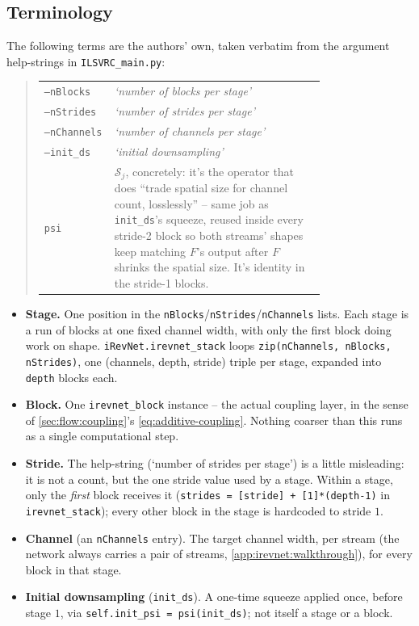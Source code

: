 \subsection{Terminology}
\label{app:irevnet:terms}
The following terms are the authors' own, taken verbatim from the argument help-strings in
\texttt{ILSVRC\_main.py}:
\begin{quote}
\begin{flushleft}
\begin{tabular}{@{}l@{\quad}p{0.75\linewidth}@{}}
\texttt{--nBlocks}  & \emph{`number of blocks per stage'}\\
\texttt{--nStrides} & \emph{`number of strides per stage'}\\
\texttt{--nChannels}& \emph{`number of channels per stage'}\\
\texttt{--init\_ds} & \emph{`initial downsampling'}\\
\texttt{psi} & $\mathcal S_j$, concretely: it's the operator that does ``trade spatial size for channel 
count, losslessly'' -- same job as \texttt{init\_ds}'s squeeze, reused inside every stride-2 block so 
both streams' shapes keep matching $F$'s output after $F$ shrinks the spatial size. It's identity in the 
stride-1 blocks.
\end{tabular}
\end{flushleft}
\end{quote}
\begin{itemize}[leftmargin=1.5em]
\item \textbf{Stage.} One position in the \texttt{nBlocks}/\texttt{nStrides}/\texttt{nChannels} lists.
	  Each stage is a run of blocks at one fixed channel width, with only the first block doing work on 
	  shape.
      \texttt{iRevNet.irevnet\_stack} loops \texttt{zip(nChannels, nBlocks, nStrides)}, one
      (channels, depth, stride) triple per stage, expanded into \texttt{depth} blocks each.
\item \textbf{Block.} One \texttt{irevnet\_block} instance -- the actual coupling layer, in the sense of
      \cref{sec:flow:coupling}'s \cref{eq:additive-coupling}. Nothing coarser than this runs as a single
      computational step.
\item \textbf{Stride.} The help-string (`number of strides per stage') is a little misleading: it is not a
      count, but the one stride value used by a stage. Within a stage, only the \emph{first} block receives
      it (\texttt{strides = [stride] + [1]*(depth-1)} in \texttt{irevnet\_stack}); every other block in the
      stage is hardcoded to stride $1$.
\item \textbf{Channel} (an \texttt{nChannels} entry). The target channel width, per stream (the network
      always carries a pair of streams, \cref{app:irevnet:walkthrough}), for every block in that stage.
\item \textbf{Initial downsampling} (\texttt{init\_ds}). A one-time squeeze applied once, before stage $1$,
      via \texttt{self.init\_psi = psi(init\_ds)}; not itself a stage or a block.
\end{itemize}
\newpage

